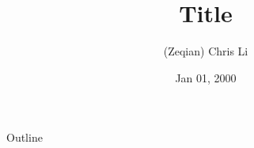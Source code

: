 \documentclass{beamer}
\title[short-title]{Title}
\author{(Zeqian) Chris Li}
\date{Jan 01, 2000}
\begin{document}
\begin{frame}
  \titlepage
\end{frame}

\begin{frame}{Outline}
 \tableofcontents
\end{frame}
\end{document}
